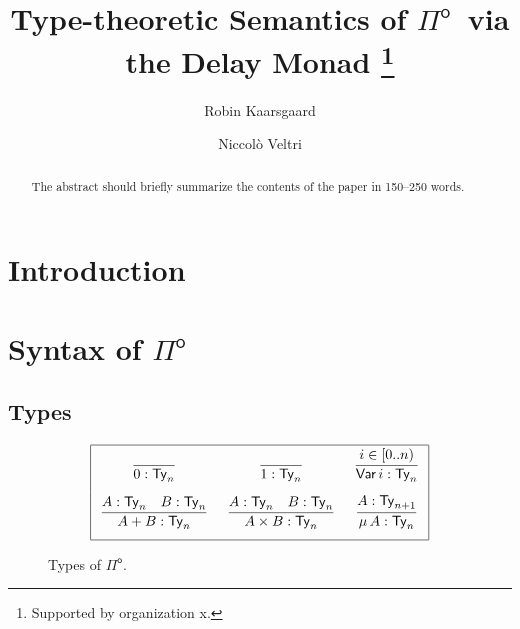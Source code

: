 \documentclass[runningheads]{llncs}
\newcommand{\Pio}{$\Pi^{\mathsf{o}}$}
\newcommand{\Ty}{\mathsf{Ty}}
\newcommand{\Var}{\mathsf{Var}}
\begin{document}
%
\title{Type-theoretic Semantics of \Pio\ via the Delay Monad \thanks{Supported by organization x.}}
%
%
\author{Robin Kaarsgaard  \and
Niccol\`o Veltri}
%
%
%
\maketitle              %
%
\begin{abstract}
The abstract should briefly summarize the contents of the paper in
150--250 words.

\end{abstract}

\section{Introduction}\label{sec:intro}

\section{Syntax of \Pio}\label{sec:syntax}

\subsection{Types}

\begin{figure}
\[
\arraycolsep=8pt\def\arraystretch{2.8}
\begin{array}{|ccc|}
\hline 
\infer{0 : \Ty_n}{} 
& \infer{1 : \Ty_n}{}
& \infer{\Var\,i : \Ty_n}{i \in [0..n)}  \\
\infer{A + B : \Ty_n}{A : \Ty_n & B : \Ty_n}
& \infer{A \times B : \Ty_n}{A : \Ty_n & B : \Ty_n}
& \infer{\mu\,A : \Ty_n}{A : \Ty_{n+1}} \\
\hline
\end{array}
\]
\caption{Types of \Pio.}
\label{fig:types}
\end{figure}
\end{document}
